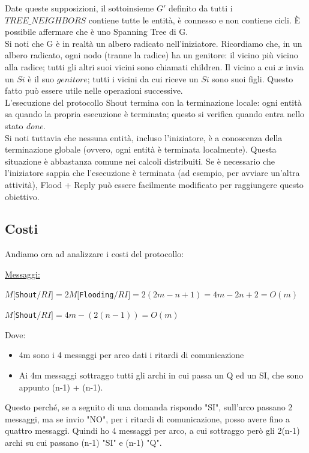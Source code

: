 Date queste supposizioni, il sottoinsieme $G'$ definito da tutti i
$TREE\_NEIGHBORS$ contiene tutte le entità, è connesso e non contiene cicli. È
possibile affermare che è uno Spanning Tree di G.\\
Si noti che G è in realtà un albero radicato nell'iniziatore. Ricordiamo che, in
un albero radicato, ogni nodo (tranne la radice) ha un genitore: il vicino più
vicino alla radice; tutti gli altri suoi vicini sono chiamati children. Il
vicino a cui $x$ invia un $Si$ è il suo $genitore$; tutti i vicini da cui riceve
un $Si$ sono suoi figli. Questo fatto può essere utile nelle operazioni
successive.\\
L'esecuzione del protocollo Shout termina con la terminazione locale: ogni
entità sa quando la propria esecuzione è terminata; questo si verifica quando
entra nello stato \textit{done}.\\
Si noti tuttavia che nessuna entità, incluso l'iniziatore, è a conoscenza della
terminazione globale (ovvero, ogni entità è terminata localmente). Questa
situazione è abbastanza comune nei calcoli distribuiti. Se è necessario che
l'iniziatore sappia che l'esecuzione è terminata (ad esempio, per avviare
un'altra attività), Flood + Reply può essere facilmente modificato per
raggiungere questo obiettivo.

\subsection{Costi}
Andiamo ora ad analizzare i costi del protocollo:

\underline{Messaggi:}
\begin{center}
    $M[$\texttt{Shout}$/RI] = 2 M[$\texttt{Flooding}$/RI] = 2(2m-n+1) = 4m - 2n +
        2 = O(m)$
\end{center}
\begin{center}
    $M[$\texttt{Shout}$/RI] = 4m - (2(n-1)) = O(m)$
\end{center}
Dove:
\begin{itemize}
    \item 4m sono i 4 messaggi per arco dati i ritardi di comunicazione
    \item Ai 4m messaggi sottraggo tutti gli archi in cui passa un Q ed un SI, che
          sono appunto (n-1) + (n-1).
\end{itemize}

Questo perché, se a seguito di una domanda rispondo "SI", sull'arco passano 2
messaggi, ma se invio "NO", per i ritardi di comunicazione, posso avere fino a
quattro messaggi. Quindi ho 4 messaggi per arco, a cui sottraggo però gli 2(n-1)
archi su cui passano (n-1) "SI" e (n-1) "Q".

